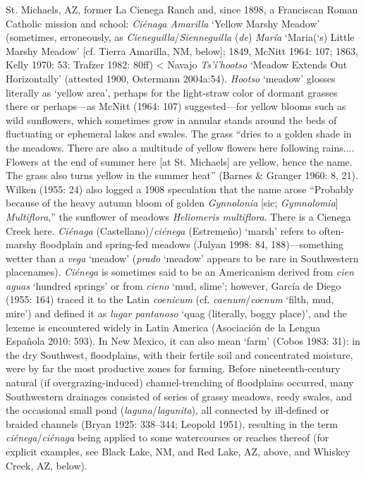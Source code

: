 St. Michaels, AZ, former La Cienega Ranch and, since 1898, a Franciscan Roman Catholic mission and school:  \textit{Ciénaga Amarilla }‘Yellow Marshy Meadow’ (sometimes, erroneously, as \textit{Cieneguilla}/\textit{Sienneguilla }(\textit{de})\textit{ María} ‘Maria(‘s) Little Marshy Meadow’ [cf. Tierra Amarilla, NM, below]; 1849, McNitt 1964: 107; 1863, Kelly 1970: 53; Trafzer 1982: 80ff) {\textless} Navajo \textit{Ts'í'hootso }‘Meadow Extends Out Horizontally’ (attested 1900, Ostermann 2004a:54).  \textit{Hootso} ‘meadow’ glosses literally as ‘yellow area’, perhaps for the light-straw color of dormant grasses there or perhaps—as McNitt (1964: 107) suggested—for yellow blooms such as wild sunflowers, which sometimes grow in annular stands around the beds of fluctuating or ephemeral lakes and swales.  The grass “dries to a golden shade in the meadows.  There are also a multitude of yellow flowers here following rains....  Flowers at the end of summer here [at St. Michaels] are yellow, hence the name.  The grass also turns yellow in the summer heat” (Barnes \& Granger 1960: 8, 21).  Wilken (1955: 24) also logged a 1908 speculation that the name arose “Probably because of the heavy autumn bloom of golden \textit{Gynnolonia }[sic; \textit{Gymnolomia}] \textit{Multiflora},” the sunflower of meadows \textit{Heliomeris multiflora}.  There is a Cienega Creek here.  \textit{Ciénaga} (Castellano)/\textit{ciénega} (Estremeño) ‘marsh’ refers to often-marshy floodplain and spring-fed meadows (Julyan 1998: 84, 188)—something wetter than a \textit{vega} ‘meadow’ (\textit{prado} ‘meadow’ appears to be rare in Southwestern placenames).  \textit{Ciénega} is sometimes said to be an Americanism derived from \textit{cien aguas} ‘hundred springs’ or from \textit{cieno} ‘mud, slime’; however, García de Diego (1955: 164) traced it to the Latin \textit{coenicum} (cf. \textit{caenum}/\textit{coenum }‘filth, mud, mire’) and defined it as \textit{lugar pantanoso} ‘quag (literally, boggy place)’, and the lexeme is encountered widely in Latin America (Asociación de la Lengua Española 2010: 593).  In New Mexico, it can also mean ‘farm’ (Cobos 1983: 31): in the dry Southwest, floodplains, with their fertile soil and concentrated moisture, were by far the most productive zones for farming.  Before nineteenth-century natural (if overgrazing-induced) channel-trenching of floodplains occurred, many Southwestern drainages consisted of series of grassy meadows, reedy swales, and the occasional small pond (\textit{laguna}/\textit{lagunita}), all connected by ill-defined or braided channels (Bryan 1925: 338–344; Leopold 1951), resulting in the term \textit{ciénega}/\textit{ciénaga} being applied to some watercourses or reaches thereof (for explicit examples, see Black Lake, NM, and Red Lake, AZ, above, and Whiskey Creek, AZ, below).

